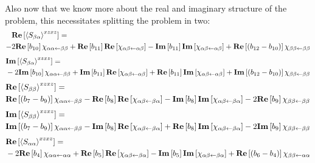 Also now that we know more about the real and imaginary structure of the problem, this necessitates splitting the problem in two:
\begin{align*}
	&\textbf{Re} \left[  \left \langle S_{\beta \alpha} \right \rangle^{xzxz}  \right] =\\
	 -& 2 \textbf{Re} \left[  b_{10} \right]  \chi_{ \alpha \alpha \leftarrow \beta \beta}   + \textbf{Re} \left[  b_{11} \right]  \textbf{Re} \left[ \chi_{ \alpha  \beta\leftarrow \alpha \beta } \right] - \textbf{Im} \left[  b_{11} \right]  \textbf{Im} \left[ \chi_{ \alpha  \beta\leftarrow \alpha \beta } \right]  +\textbf{Re} \left[ \left(  b_{12} - b_{10} \right)  \right]\chi_{ \beta \beta \leftarrow \beta \beta }
\end{align*}
\begin{align*}
	&\textbf{Im} \left[  \left \langle S_{\beta \alpha} \right \rangle^{xzxz}  \right] =\\
	 &- 2 \textbf{Im} \left[  b_{10} \right]  \chi_{ \alpha \alpha \leftarrow \beta \beta}   + \textbf{Im} \left[  b_{11} \right]  \textbf{Re} \left[ \chi_{ \alpha  \beta\leftarrow \alpha \beta } \right] + \textbf{Re} \left[  b_{11} \right]  \textbf{Im} \left[ \chi_{ \alpha  \beta\leftarrow \alpha \beta } \right]  +\textbf{Im} \left[ \left(  b_{12} - b_{10} \right)  \right]\chi_{ \beta \beta \leftarrow \beta \beta }
\end{align*}
\begin{align*}
	&\textbf{Re} \left[  \left \langle S_{\beta \beta} \right \rangle^{xzxz}  \right] =\\
	  &\textbf{Re} \left[ \left( b_7 - b_9 \right) \right]   \chi_{ \alpha \alpha \leftarrow \beta \beta } - \textbf{Re} \left[ b_8 \right] \textbf{Re} \left[ \chi_{\alpha \beta \leftarrow \beta \alpha} \right] - \textbf{Im} \left[ b_8 \right] \textbf{Im} \left[ \chi_{\alpha \beta \leftarrow \beta \alpha} \right]  - 2 \textbf{Re} \left[ b_9 \right]  \chi_{ \beta \beta \leftarrow \beta \beta}
\end{align*}
\begin{align*}
	&\textbf{Im} \left[  \left \langle S_{\beta \beta} \right \rangle^{xzxz}  \right] =\\
	  &\textbf{Im} \left[ \left( b_7 - b_9 \right) \right]   \chi_{ \alpha \alpha \leftarrow \beta \beta } - \textbf{Im} \left[ b_8 \right] \textbf{Re} \left[ \chi_{\alpha \beta \leftarrow \beta \alpha} \right] + \textbf{Re} \left[ b_8 \right] \textbf{Im} \left[ \chi_{\alpha \beta \leftarrow \beta \alpha} \right]  - 2 \textbf{Im} \left[ b_9 \right]  \chi_{ \beta \beta \leftarrow \beta \beta}
\end{align*}
\begin{align*}
	&\textbf{Re} \left[ \left \langle S_{\alpha \alpha} \right \rangle^{xzxz}  \right] =\\
	 &-2  \textbf{Re} \left[ b_4 \right] \chi_{ \alpha \alpha \leftarrow \alpha \alpha}  + \textbf{Re} \left[ b_5 \right] \textbf{Re} \left[  \chi_{\alpha \beta \leftarrow \beta \alpha}  \right] - \textbf{Im} \left[ b_5 \right] \textbf{Im} \left[  \chi_{\alpha \beta \leftarrow \beta \alpha}  \right]+ \textbf{Re} \left[ \left( b_6 - b_4 \right) \right] \chi_{\beta \beta \leftarrow \alpha \alpha}
\end{align*}
